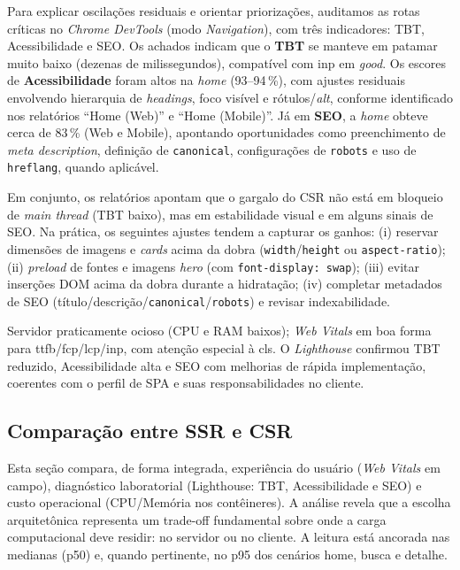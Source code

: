 {Para explicar oscilações residuais e orientar priorizações, auditamos as rotas críticas no \emph{Chrome DevTools} (modo \emph{Navigation}), com três indicadores: TBT, Acessibilidade e SEO. Os achados indicam que o \textbf{TBT} se manteve em patamar muito baixo (dezenas de milissegundos), compatível com \acrshort{inp} em \textit{good}. Os escores de \textbf{Acessibilidade} foram altos na \emph{home} (93--94\,\%), com ajustes residuais envolvendo hierarquia de \emph{headings}, foco visível e rótulos/\textit{alt}, conforme identificado nos relatórios “Home (Web)” e “Home (Mobile)”. Já em \textbf{SEO}, a \emph{home} obteve cerca de 83\,\% (Web e Mobile), apontando oportunidades como preenchimento de \emph{meta description}, definição de \texttt{canonical}, configurações de \texttt{robots} e uso de \texttt{hreflang}, quando aplicável.

Em conjunto, os relatórios apontam que o gargalo do CSR não está em bloqueio de \emph{main thread} (TBT baixo), mas em estabilidade visual e em alguns sinais de SEO. Na prática, os seguintes ajustes tendem a capturar os ganhos: (i) reservar dimensões de imagens e \emph{cards} acima da dobra (\texttt{width}/\texttt{height} ou \texttt{aspect-ratio}); (ii) \emph{preload} de fontes e imagens \emph{hero} (com \texttt{font-display: swap}); (iii) evitar inserções DOM acima da dobra durante a hidratação; (iv) completar metadados de SEO (título/descrição/\texttt{canonical}/\texttt{robots}) e revisar indexabilidade.

Servidor praticamente ocioso (CPU e RAM baixos); \emph{Web Vitals} em boa forma para \acrshort{ttfb}/\acrshort{fcp}/\acrshort{lcp}/\acrshort{inp}, com atenção especial à \acrshort{cls}. O \emph{Lighthouse} confirmou TBT reduzido, Acessibilidade alta e SEO com melhorias de rápida implementação, coerentes com o perfil de SPA e suas responsabilidades no cliente.

\subsection{Comparação entre SSR e CSR}
\label{subsec:comparacao-ssr-csr}

Esta seção compara, de forma integrada, experiência do usuário (\emph{Web Vitals} em campo), diagnóstico laboratorial (Lighthouse: TBT, Acessibilidade e SEO) e custo operacional (CPU/Memória nos contêineres). A análise revela que a escolha arquitetônica representa um trade-off fundamental sobre onde a carga computacional deve residir: no servidor ou no cliente. A leitura está ancorada nas medianas (p50) e, quando pertinente, no p95 dos cenários home, busca e detalhe.

}
